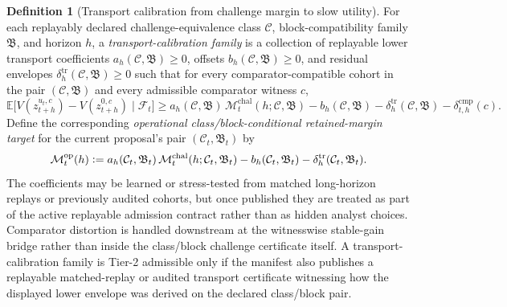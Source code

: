 \documentclass[11pt]{article}
\theoremstyle{definition}
\newtheorem{definition}[theorem]{Definition}
\newcommand{\E}{\mathbb{E}}
\newcommand{\1}{\mathbf{1}}
\newcommand{\Defeq}{\vcentcolon=}
\begin{document}
\begin{definition}[Transport calibration from challenge margin to slow utility]\label{def:transport_calibration}
For each replayably declared challenge-equivalence class $\mathcal C$, block-compatibility family $\mathfrak B$, and horizon $h$, a \emph{transport-calibration family} is a collection of replayable lower transport coefficients $a_h(\mathcal C,\mathfrak B)\ge 0$, offsets $b_h(\mathcal C,\mathfrak B)\ge 0$, and residual envelopes $\delta_h^{\mathrm{tr}}(\mathcal C,\mathfrak B)\ge 0$ such that for every comparator-compatible cohort in the pair $(\mathcal C,\mathfrak B)$ and every admissible comparator witness $c$,
\[
\E\bigl[V(z_{t+h}^{u_t,c})-V(z_{t+h}^{0,c})\mid \mathcal F_t\bigr]
\ge
 a_h(\mathcal C,\mathfrak B)\,\mathcal M_t^{\mathrm{chal}}(h;\mathcal C,\mathfrak B)-b_h(\mathcal C,\mathfrak B)-\delta_h^{\mathrm{tr}}(\mathcal C,\mathfrak B)-\delta_{t,h}^{\mathrm{cmp}}(c).
\]
Define the corresponding \emph{operational class/block-conditional retained-margin target} for the current proposal's pair $(\mathcal C_t,\mathfrak B_t)$ by
\[
\mathcal M_t^{\mathrm{op}}(h)
\Defeq
a_h(\mathcal C_t,\mathfrak B_t)\,\mathcal M_t^{\mathrm{chal}}(h;\mathcal C_t,\mathfrak B_t)-b_h(\mathcal C_t,\mathfrak B_t)-\delta_h^{\mathrm{tr}}(\mathcal C_t,\mathfrak B_t).
\]
The coefficients may be learned or stress-tested from matched long-horizon replays or previously audited cohorts, but once published they are treated as part of the active replayable admission contract rather than as hidden analyst choices. Comparator distortion is handled downstream at the witnesswise stable-gain bridge rather than inside the class/block challenge certificate itself. A transport-calibration family is Tier-2 admissible only if the manifest also publishes a replayable matched-replay or audited transport certificate witnessing how the displayed lower envelope was derived on the declared class/block pair.
\end{definition}
\end{document}
